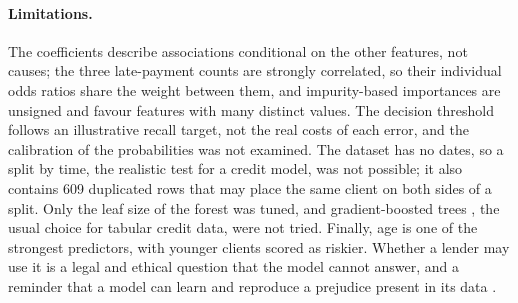 \paragraph{Limitations.} The coefficients describe associations conditional on
the other features, not causes; the three late-payment counts are strongly
correlated, so their individual odds ratios share the weight between them, and
impurity-based importances are unsigned and favour features with many distinct
values. The decision threshold follows an illustrative recall target, not the
real costs of each error, and the calibration of the probabilities was not
examined. The dataset has no dates, so a split by time, the realistic test for
a credit model, was not possible; it also contains 609 duplicated rows that may
place the same client on both sides of a split. Only the leaf size of the
forest was tuned, and gradient-boosted trees \citep{chen2016xgboost}, the
usual choice for tabular credit data, were not tried. Finally, age is one of
the strongest predictors, with younger clients scored as riskier. Whether a
lender may use it is a legal and ethical question that the model cannot
answer, and a reminder that a model can learn and reproduce a prejudice
present in its data \citep{oku2026slides}.
